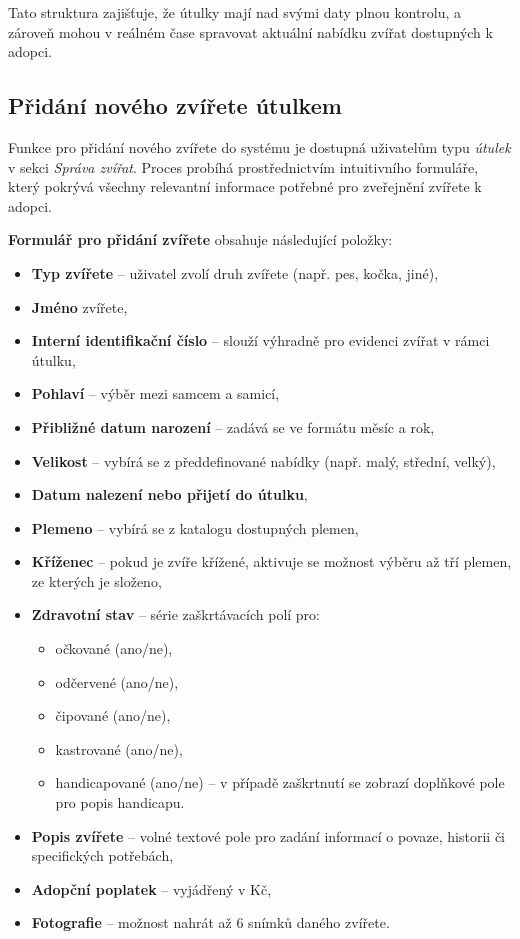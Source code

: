 \documentclass[czech, bp, kiv, he, iso690numb, pdf]{fasthesis}
\begin{document}
    \noindent Tato struktura zajišťuje, že útulky mají nad svými daty plnou kontrolu, a zároveň mohou v reálném čase spravovat aktuální nabídku zvířat dostupných k adopci.

    \subsection{Přidání nového zvířete útulkem}

    Funkce pro přidání nového zvířete do systému je dostupná uživatelům typu \textit{útulek} v sekci \textit{Správa zvířat}. Proces probíhá prostřednictvím intuitivního formuláře, který pokrývá všechny relevantní informace potřebné pro zveřejnění zvířete k adopci.

    \noindent \textbf{Formulář pro přidání zvířete} obsahuje následující položky:
    \begin{itemize}[leftmargin=2em]
        \item \textbf{Typ zvířete} – uživatel zvolí druh zvířete (např. pes, kočka, jiné),
        \item \textbf{Jméno} zvířete,
        \item \textbf{Interní identifikační číslo} – slouží výhradně pro evidenci zvířat v rámci útulku,
        \item \textbf{Pohlaví} – výběr mezi samcem a samicí,
        \item \textbf{Přibližné datum narození} – zadává se ve formátu měsíc a rok,
        \item \textbf{Velikost} – vybírá se z předdefinované nabídky (např. malý, střední, velký),
        \item \textbf{Datum nalezení nebo přijetí do útulku},
        \item \textbf{Plemeno} – vybírá se z katalogu dostupných plemen,
        \item \textbf{Kříženec} – pokud je zvíře křížené, aktivuje se možnost výběru až tří plemen, ze kterých je složeno,
        \item \textbf{Zdravotní stav} – série zaškrtávacích polí pro:
        \begin{itemize}
            \item očkované (ano/ne),
            \item odčervené (ano/ne),
            \item čipované (ano/ne),
            \item kastrované (ano/ne),
            \item handicapované (ano/ne) – v případě zaškrtnutí se zobrazí doplňkové pole pro popis handicapu.
        \end{itemize}
        \item \textbf{Popis zvířete} – volné textové pole pro zadání informací o povaze, historii či specifických potřebách,
        \item \textbf{Adopční poplatek} – vyjádřený v Kč,
        \item \textbf{Fotografie} – možnost nahrát až 6 snímků daného zvířete.
    \end{itemize}
\end{document}
